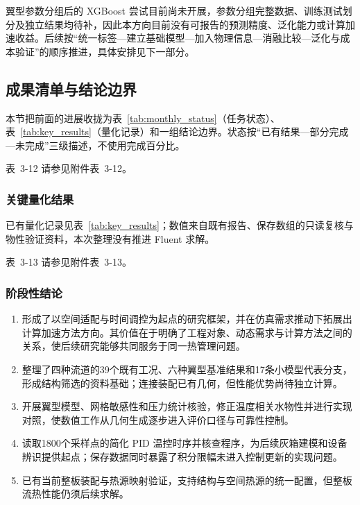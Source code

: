 \documentclass[UTF8]{midterm}
\makeatletter
\newcommand{\submissionnumber}[1]{\def\@currentlabel{#1}}
\makeatother
\begin{document}
翼型参数分组后的 XGBoost 尝试目前尚未开展，参数分组完整数据、训练测试划分及独立结果均待补，因此本方向目前没有可报告的预测精度、泛化能力或计算加速收益。后续按“统一标签—建立基础模型—加入物理信息—消融比较—泛化与成本验证”的顺序推进，具体安排见下一部分。



\subsection{成果清单与结论边界}
本节把前面的进展收拢为表~\ref{tab:monthly_status}（任务状态）、表~\ref{tab:key_results}（量化记录）和一组结论边界。状态按“已有结果—部分完成—未完成”三级描述，不使用完成百分比。


\par\noindent \begingroup\submissionnumber{3-12}\label{tab:monthly_status}\endgroup 表~3-12 请参见附件表~3-12。\par

\subsubsection{关键量化结果}

已有量化记录见表~\ref{tab:key_results}；数值来自既有报告、保存数组的只读复核与物性验证资料，本次整理没有推进 Fluent 求解。

\par\noindent \begingroup\submissionnumber{3-13}\label{tab:key_results}\endgroup 表~3-13 请参见附件表~3-13。\par





\subsubsection{阶段性结论}
\begin{enumerate}
\item 形成了以空间适配与时间调控为起点的研究框架，并在仿真需求推动下拓展出计算加速方法方向。其价值在于明确了工程对象、动态需求与计算方法之间的关系，使后续研究能够共同服务于同一热管理问题。
\item 整理了四种流道的39个既有工况、六种翼型基准结果和17条小模型代表分支，形成结构筛选的资料基础；连接装配已有几何，但性能优势尚待独立计算。
\item 开展翼型模型、网格敏感性和压力统计核验，修正温度相关水物性并进行实现对照，使数值工作从几何生成逐步进入评价口径与可靠性控制。
\item 读取1800个采样点的简化 PID 温控时序并核查程序，为后续灰箱建模和设备辨识提供起点；保存数据同时暴露了积分限幅未进入控制更新的实现问题。
\item 已有当前整板装配与热源映射验证，支持结构与空间热源的统一配置，但整板流热性能仍须后续求解。
\end{enumerate}
\end{document}
